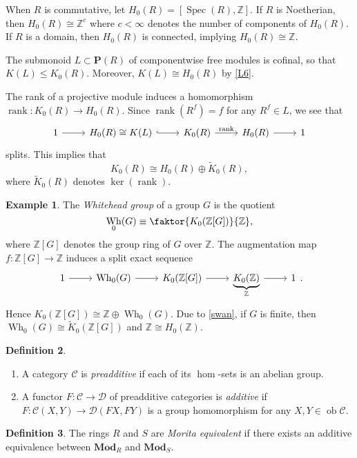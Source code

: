 \documentclass[10pt,letterpaper,cm]{nupset}
\theoremstyle{definition}
\newtheorem{definition}{Definition}[section]
\newtheorem{exmp}[definition]{Example}
\theoremstyle{theorem}
\theoremstyle{remark}
\renewcommand{\P}{\mathbf P}
\newcommand{\Z}{\mathbb Z}
\newcommand{\1}{\mathbf{1}}
\renewcommand{\c}{\mathscr{C}}
\renewcommand{\d}{\mathscr{D}}
\newcommand{\0}{\vec 0}
\DeclareMathOperator{\ob}{ob}
\DeclareMathOperator{\spec}{Spec}
\DeclareMathOperator{\rank}{rank}
\DeclareMathOperator{\wh}{Wh}
\begin{document}
\smallskip

When $R$ is commutative, let $H_0(R) = \left[\spec(R), \Z\right]$. If $R$ is Noetherian, then $H_0(R) \cong \Z^c$ where $c <\infty$ denotes the number of components of $H_0(R)$. If $R$ is a domain, then $H_0(R)$ is connected, implying $H_0(R) \cong \Z$.

The submonoid $L\subset \P(R)$ of componentwise free modules is cofinal, so that $K(L) \leq K_0(R)$. Moreover, $K(L) \cong H_0(R)$ by \cref{L6}.

The rank of a projective module induces a homomorphism $\rank: K_0(R) \to H_0(R)$. Since $\rank(R^f) = f$ for any $R^f \in L$, we see that
\[
\begin{tikzcd}
1 \arrow[r] & H_0(R) \cong K(L) \arrow[r, hook] & K_0(R) \arrow[r, "\rank"] & H_0(R) \arrow[r] & 1
\end{tikzcd}
\]
splits. This implies that $$K_0(R) \cong H_0(R) \oplus \widetilde{K}_0(R),$$ where $\widetilde{K}_0(R)$ denotes $\ker(\rank)$.


\begin{exmp}
The \textit{Whitehead group} of a group $G$ is the quotient $$\wh_0(G) \equiv \faktor{K_0(\Z[G])}{\Z},$$ where $\Z[G]$ denotes the group ring of $G$ over $\Z$. The augmentation map $f: \Z[G] \to \Z$ induces a split exact sequence 
\[
\begin{tikzcd}
1 \arrow[r] & \wh_0(G) \arrow[r] & K_0(\Z[G]) \arrow[r] & \underbrace{K_0(\Z)}_{\Z} \arrow[r] & 1
\end{tikzcd}.
\]
 Hence $K_0(\Z[G]) \cong \Z \oplus \wh_0(G)$. Due to \cref{swan}, if $G$ is finite, then $\wh_0(G) \cong \widetilde{K}_0(\Z[G])$  and $\Z \cong H_0(\Z)$. 
\end{exmp}

\smallskip

\begin{definition} $ $
\begin{enumerate}
\item A category $\c$ is \textit{preadditive} if each of its $\hom$-sets is an abelian group.
\item A functor $F: \c \to \d$ of preadditive categories is \textit{additive} if $F: \c(X, Y) \to \d(FX, FY)$ is a group homomorphism for any $X, Y \in \ob \c$.
\end{enumerate}
\end{definition}

\begin{definition}
The rings $R$ and $S$ are \textit{Morita equivalent} if there exists an additive equivalence between $\mathbf{Mod}_R$ and $\mathbf{Mod}_S$. 
\end{definition}
\end{document}

